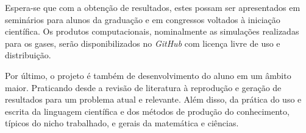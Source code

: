 Espera-se que com a obtenção de resultados, estes possam ser apresentados em seminários para alunos da graduação e em congressos voltados à iniciação científica. Os produtos computacionais, nominalmente as simulações realizadas para os gases, serão disponibilizados no \textit{GitHub} com licença livre de uso e distribuição. 

Por último, o projeto é também de desenvolvimento do aluno em um âmbito maior. Praticando desde a revisão de literatura à reprodução e geração de resultados para um problema atual e relevante. Além disso, da prática do uso e escrita da linguagem científica e dos métodos de produção do conhecimento, típicos do nicho trabalhado, e gerais da matemática e ciências.